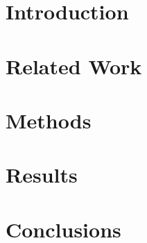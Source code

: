 \documentclass{thesis}
\begin{document}
\maketitle





\thesisTables
\thesisBodyStart

\chapter{Introduction}


\chapter{Related Work}


\chapter{Methods}


\chapter{Results}


\chapter{Conclusions}


\printReferences
\end{document}
